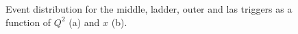\begin{figure}[!h]
	\caption{Event distribution for the middle, ladder, outer and las triggers as a function of $Q^2$ (a) and $x$ (b).}
	\label{pic:triggerxQ2}
\end{figure}

